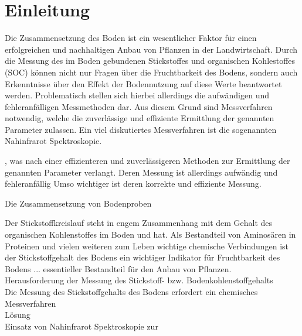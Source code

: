 \section{Einleitung}
\label{sec:Einleitung}

    Die Zusammensetzung des Boden ist ein wesentlicher Faktor für einen erfolgreichen und nachhaltigen Anbau von Pflanzen in der Landwirtschaft.
    Durch die Messung des im Boden gebundenen Stickstoffes und organischen Kohlestoffes (SOC) können nicht nur Fragen über die Fruchtbarkeit des Bodens, sondern auch Erkenntnisse über den Effekt der Bodennutzung auf diese Werte beantwortet werden.
    Problematisch stellen sich hierbei allerdings die aufwändigen und fehleranfälligen Messmethoden dar.
    Aus diesem Grund sind Messverfahren notwendig, welche die zuverlässige und effiziente Ermittlung der genannten Parameter zulassen.
    Ein viel diskutiertes Messverfahren ist die sogenannten Nahinfrarot Spektroskopie.
    
    
    , was nach einer effizienteren und zuverlässigeren Methoden zur Ermittlung der genannten Parameter verlangt.
    Deren Messung ist allerdings aufwändig und fehleranfällig
    Umso wichtiger ist deren korrekte und effiziente Messung.

    Die Zusammensetzung von Bodenproben 
	
	Der Stickstoffkreislauf steht in engem Zusammenhang mit dem Gehalt des organischen Kohlenstoffes im Boden und hat. 
	Als Bestandteil von Aminosären in Proteinen und vielen weiteren zum Leben wichtige chemische Verbindungen ist der Stickstoffgehalt des Bodens ein wichtiger Indikator für Fruchtbarkeit des Bodens ... essentieller Bestandteil für den Anbau von Pflanzen.\\
	
	Herausforderung der Messung des Stickstoff- bzw. Bodenkohlenstoffgehalts\\
	Die Messung des Stickstoffgehalts des Bodens erfordert ein chemisches Messverfahren
    \\
    
    Lösung\\
    Einsatz von Nahinfrarot Spektroskopie zur 
	
